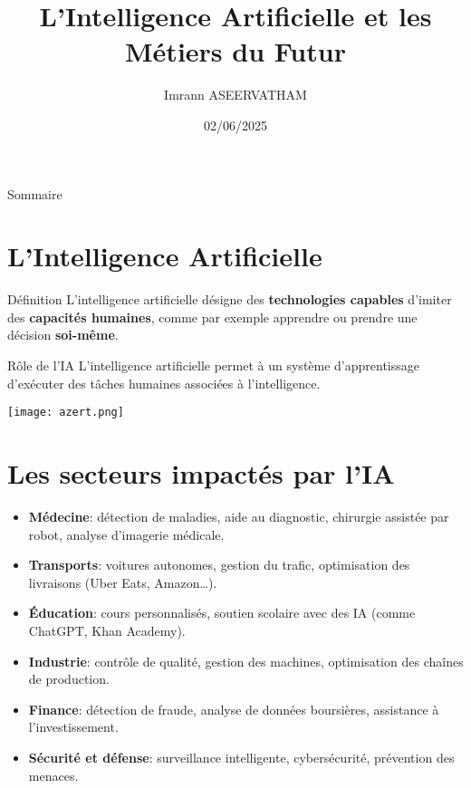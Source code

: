 \documentclass[aspectratio=169]{beamer}
\title{L'Intelligence Artificielle et les Métiers du Futur}
\author{Imrann ASEERVATHAM}
\institute{3B, Collège des Touleuses}
\date{02/06/2025}
\begin{document}
\maketitle

\begin{frame}{Sommaire}
\tableofcontents
\end{frame}

\section{L’Intelligence Artificielle}
\begin{frame}
\begin{block}{Définition}
L'intelligence artificielle désigne des \textbf{technologies capables} d'imiter des \textbf{capacités humaines}, comme par exemple apprendre ou prendre une décision \textbf{soi-même}.
\end{block}
\vspace{0.5cm}
\begin{block}{Rôle de l'IA}
L'intelligence artificielle permet à un système d'apprentissage d'exécuter des tâches humaines associées à l'intelligence.
\end{block}
\end{frame}

\begin{frame}
\centering
\texttt{[image: azert.png]}
\end{frame}

\section{Les secteurs impactés par l'IA}
\begin{frame}
\begin{itemize}
\item \textbf{Médecine}: détection de maladies, aide au diagnostic, chirurgie assistée par robot, analyse d’imagerie médicale.
\item \textbf{Transports}: voitures autonomes, gestion du trafic, optimisation des livraisons (Uber Eats, Amazon…).
\item \textbf{Éducation}: cours personnalisés, soutien scolaire avec des IA (comme ChatGPT, Khan Academy).
\item \textbf{Industrie}: contrôle de qualité, gestion des machines, optimisation des chaînes de production.
\item \textbf{Finance}: détection de fraude, analyse de données boursières, assistance à l’investissement.
\item \textbf{Sécurité et défense}: surveillance intelligente, cybersécurité, prévention des menaces.
\end{itemize}
\end{frame}
\end{document}
